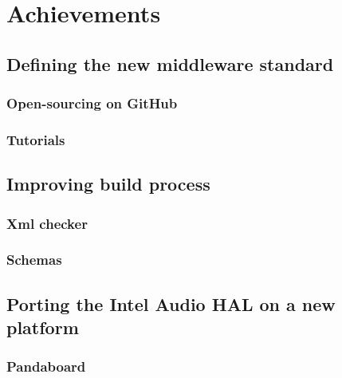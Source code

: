 \chapter{Achievements}

\section{Defining the new middleware standard}
\subsection{Open-sourcing on GitHub}
\subsection{Tutorials}

\section{Improving build process}
\subsection{Xml checker}
\subsection{Schemas}

\section{Porting the Intel Audio HAL on a new platform}
\subsection{Pandaboard}
